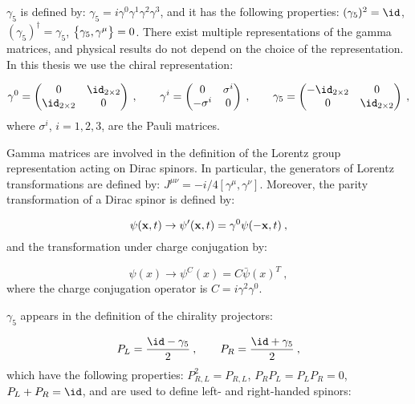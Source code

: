 $\gamma_5$ is defined by: $\gamma_5 = i \gamma^0 \gamma^1 \gamma^2 \gamma^3$, and it has the following properties: $(\gamma_5)^2=\id$, $(\gamma_5)^{\dagger} = \gamma_5$, $\qty \big{\gamma_5, \gamma^{\mu}} = 0$. There exist multiple representations of the gamma matrices, and physical results do not depend on the choice of the representation. In this thesis we use the chiral representation:

\begin{equation}
\gamma^0 = 
\begin{pmatrix}
0 & \id_{2 \times 2} \\
\id_{2 \times 2} & 0
\end{pmatrix}
\: ,
\qquad
\gamma^i = 
\begin{pmatrix}
0 & \sigma^i \\
-\sigma^i & 0
\end{pmatrix}
\: ,
\qquad
\gamma_5 = 
\begin{pmatrix}
-\id_{2 \times 2} & 0 \\
0  & \id_{2 \times 2}
\end{pmatrix}
\: ,
\end{equation}
%
where $\sigma^i$, $i=1,2,3$, are the Pauli matrices.

Gamma matrices are involved in the definition of the Lorentz group representation acting on Dirac spinors. In particular, the generators of Lorentz transformations are defined by: $J^{\mu \nu} = -i/4 [\gamma^{\mu},\gamma^{\nu}]$. Moreover, the parity transformation of a Dirac spinor is defined by:

\begin{equation}
\psi(\textbf x, t) \to \psi'(\textbf x, t) = \gamma^0 \psi(-\textbf x, t) \: ,
\end{equation}
%
and the transformation under charge conjugation by:

\begin{equation}
\psi(x) \to \psi^C(x) = C \bar \psi(x)^T \: ,
\end{equation}
%
where the charge conjugation operator is $C = i \gamma^2 \gamma^0$.

$\gamma_5$ appears in the definition of the chirality projectors:

\begin{equation}
P_L = \frac{\id - \gamma_5}{2} \: , \qquad P_R = \frac{\id + \gamma_5}{2} \: ,
\end{equation}
%
which have the following properties: $P_{R,L}^2 = P_{R,L}$, $P_R P_L = P_L P_R = 0$, $P_L + P_R = \id$, and are used to define left- and right-handed spinors:

